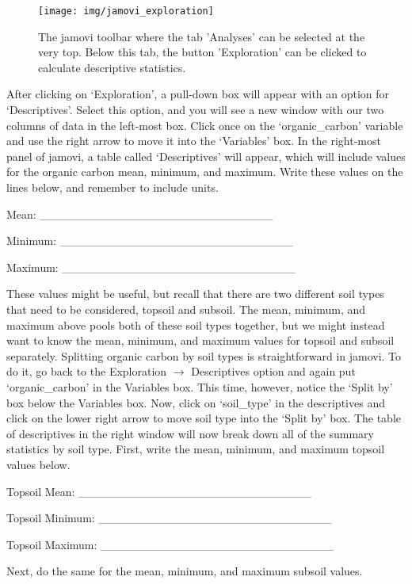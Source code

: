 \documentclass[
]{scrbook}
\begin{document}
\begin{figure}
\texttt{[image: img/jamovi\_exploration]} \caption{The jamovi toolbar where the tab 'Analyses' can be selected at the very top. Below this tab, the button 'Exploration' can be clicked to calculate descriptive statistics.}\label{fig:unnamed-chunk-29}
\end{figure}

After clicking on `Exploration', a pull-down box will appear with an option for `Descriptives'.
Select this option, and you will see a new window with our two columns of data in the left-most box.
Click once on the `organic\_carbon' variable and use the right arrow to move it into the `Variables' box.
In the right-most panel of jamovi, a table called `Descriptives' will appear, which will include values for the organic carbon mean, minimum, and maximum.
Write these values on the lines below, and remember to include units.

Mean: \_\_\_\_\_\_\_\_\_\_\_\_\_\_\_\_\_\_\_\_\_\_\_\_\_\_\_\_

Minimum: \_\_\_\_\_\_\_\_\_\_\_\_\_\_\_\_\_\_\_\_\_\_\_\_\_\_\_\_

Maximum: \_\_\_\_\_\_\_\_\_\_\_\_\_\_\_\_\_\_\_\_\_\_\_\_\_\_\_\_

These values might be useful, but recall that there are two different soil types that need to be considered, topsoil and subsoil.
The mean, minimum, and maximum above pools both of these soil types together, but we might instead want to know the mean, minimum, and maximum values for topsoil and subsoil separately.
Splitting organic carbon by soil types is straightforward in jamovi.
To do it, go back to the Exploration \(\to\) Descriptives option and again put `organic\_carbon' in the Variables box.
This time, however, notice the `Split by' box below the Variables box.
Now, click on `soil\_type' in the descriptives and click on the lower right arrow to move soil type into the `Split by' box.
The table of descriptives in the right window will now break down all of the summary statistics by soil type.
First, write the mean, minimum, and maximum topsoil values below.

Topsoil Mean: \_\_\_\_\_\_\_\_\_\_\_\_\_\_\_\_\_\_\_\_\_\_\_\_\_\_\_\_

Topsoil Minimum: \_\_\_\_\_\_\_\_\_\_\_\_\_\_\_\_\_\_\_\_\_\_\_\_\_\_\_\_

Topsoil Maximum: \_\_\_\_\_\_\_\_\_\_\_\_\_\_\_\_\_\_\_\_\_\_\_\_\_\_\_\_

Next, do the same for the mean, minimum, and maximum subsoil values.
\end{document}
